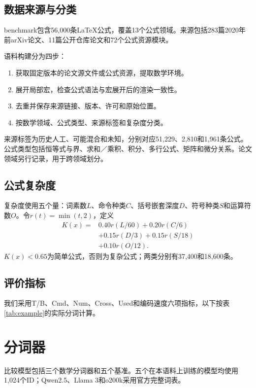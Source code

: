 \subsection{数据来源与分类}
benchmark包含56,000条LaTeX公式，覆盖13个公式领域。来源包括283篇2020年前arXiv论文、11篇公开仓库论文和72个公式资源模块。


语料构建分为四步：
\begin{enumerate}
\item 获取固定版本的论文源文件或公式资源，提取数学环境。
\item 展开局部宏，检查公式语法与宏展开后的渲染一致性。
\item 去重并保存来源链接、版本、许可和原始位置。
\item 按数学领域、公式类型、来源标签和复杂度分类。
\end{enumerate}


来源标签为历史人工、可能混合和未知，分别对应51,229、2,810和1,961条公式。公式类型包括恒等式与界、求和／乘积、积分、多行公式、矩阵和微分关系。论文领域另行记录，用于跨领域划分。

\subsection{公式复杂度}
复杂度使用五个量：词素数$L$、命令种类$C$、括号嵌套深度$D$、符号种类$S$和运算符数$O$。令$r(t)=\min(t,2)$，定义
\begin{equation}\label{eq:complexity}
\begin{aligned}
K(x)={}&0.40r(L/60)+0.20r(C/6)\\
       &+0.15r(D/3)+0.15r(S/18)\\
       &+0.10r(O/12).
\end{aligned}
\end{equation}
$K(x)<0.65$为简单公式，否则为复杂公式；两类分别有37,400和18,600条。


\subsection{评价指标}

我们采用T/B、Cmd、Num、Cross、Used和编码速度六项指标，以下按表\ref{tab:example}的实际分词计算。


\section{分词器}
比较模型包括三个数学分词器和五个基准。五个在本语料上训练的模型均使用1,024个ID；Qwen2.5、Llama 3和o200k采用官方完整词表。

